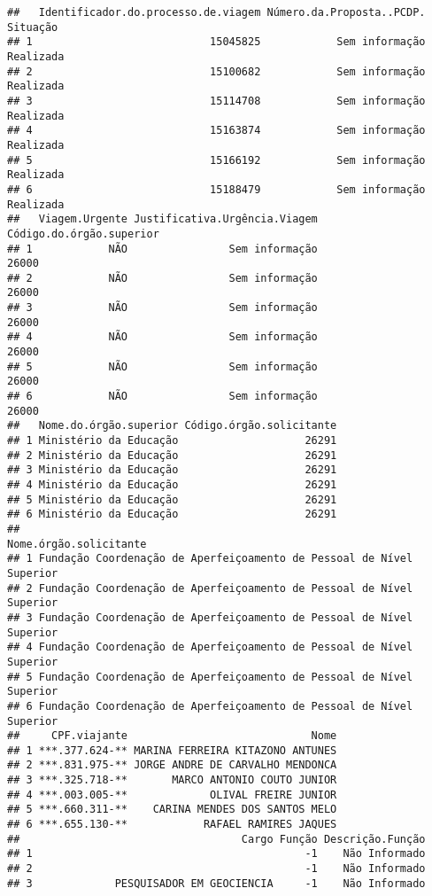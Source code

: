 \documentclass[
]{article}
\begin{document}
\begin{verbatim}
##   Identificador.do.processo.de.viagem Número.da.Proposta..PCDP.  Situação
## 1                            15045825            Sem informação Realizada
## 2                            15100682            Sem informação Realizada
## 3                            15114708            Sem informação Realizada
## 4                            15163874            Sem informação Realizada
## 5                            15166192            Sem informação Realizada
## 6                            15188479            Sem informação Realizada
##   Viagem.Urgente Justificativa.Urgência.Viagem Código.do.órgão.superior
## 1            NÃO                Sem informação                    26000
## 2            NÃO                Sem informação                    26000
## 3            NÃO                Sem informação                    26000
## 4            NÃO                Sem informação                    26000
## 5            NÃO                Sem informação                    26000
## 6            NÃO                Sem informação                    26000
##   Nome.do.órgão.superior Código.órgão.solicitante
## 1 Ministério da Educação                    26291
## 2 Ministério da Educação                    26291
## 3 Ministério da Educação                    26291
## 4 Ministério da Educação                    26291
## 5 Ministério da Educação                    26291
## 6 Ministério da Educação                    26291
##                                                 Nome.órgão.solicitante
## 1 Fundação Coordenação de Aperfeiçoamento de Pessoal de Nível Superior
## 2 Fundação Coordenação de Aperfeiçoamento de Pessoal de Nível Superior
## 3 Fundação Coordenação de Aperfeiçoamento de Pessoal de Nível Superior
## 4 Fundação Coordenação de Aperfeiçoamento de Pessoal de Nível Superior
## 5 Fundação Coordenação de Aperfeiçoamento de Pessoal de Nível Superior
## 6 Fundação Coordenação de Aperfeiçoamento de Pessoal de Nível Superior
##     CPF.viajante                             Nome
## 1 ***.377.624-** MARINA FERREIRA KITAZONO ANTUNES
## 2 ***.831.975-** JORGE ANDRE DE CARVALHO MENDONCA
## 3 ***.325.718-**       MARCO ANTONIO COUTO JUNIOR
## 4 ***.003.005-**             OLIVAL FREIRE JUNIOR
## 5 ***.660.311-**    CARINA MENDES DOS SANTOS MELO
## 6 ***.655.130-**            RAFAEL RAMIRES JAQUES
##                                   Cargo Função Descrição.Função
## 1                                           -1    Não Informado
## 2                                           -1    Não Informado
## 3             PESQUISADOR EM GEOCIENCIA     -1    Não Informado

\end{verbatim}
\end{document}
